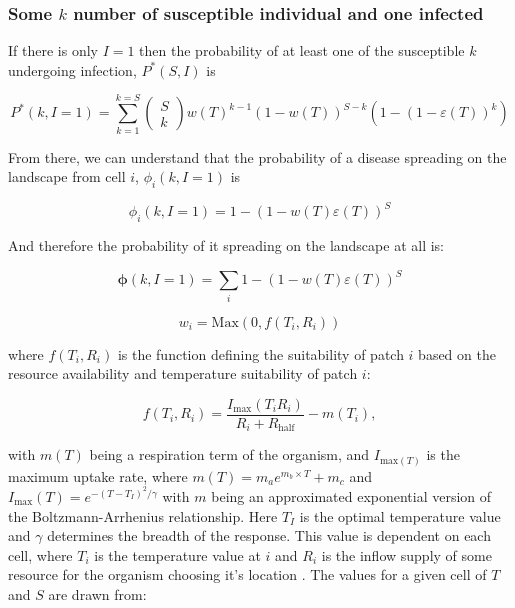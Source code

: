 \subsubsection{Some $k$ number of susceptible individual and one infected}

If there is only $I = 1$ then the probability of at least one of the susceptible $k$ undergoing infection, $P^*(S, I)$ is

\begin{equation}
    P^*(k, I=1) = \sum^{k=S}_{k = 1}\begin{pmatrix} S\\ k \end{pmatrix} w(T)^{k-1}(1-w(T))^{S-k}(1 - (1-\varepsilon(T))^k)
\end{equation}

From there, we can understand that the probability of a disease spreading on the landscape from cell $i$, $\phi_{i}(k, I = 1)$ is 

\begin{equation}
    \phi_{i}(k, I = 1) = 1 - (1 - w(T) \varepsilon(T))^S
\end{equation}

And therefore the probability of it spreading on the landscape at all is:

\begin{equation}
    \boldsymbol{\phi}(k, I = 1) = \sum_i 1 - (1 - w(T) \varepsilon(T))^S
\end{equation}





\begin{equation}
    w_{i} = \text{Max}(0, f(T_{i}, R_{i}))
\end{equation}

where $f(T_{i}, R_{i})$ is the function defining the suitability of patch $i$ based on the resource availability and temperature suitability of patch $i$:

\begin{equation}
    f(T_{i}, R_{i}) = \frac{I_{\text{max}}(T_{i} R_{i})}{R_{i} + R_{\text{half}}} - m(T_{i}),
\end{equation}

with $m(T)$ being a respiration term of the organism, and $I_{\text{max}(T)}$ is the maximum uptake rate, where $m(T) = m_a e^{m_b \times T} + m_c$ and $I_{\text{max}}(T) = e^{-(T - T_I)^2 / \gamma}$ with $m$ being an approximated exponential version of the Boltzmann-Arrhenius relationship. Here $T_I$ is the optimal temperature value and $\gamma$ determines the breadth of the response. This value is dependent on each cell, where $T_{i}$ is the temperature value at $i$ and $R_{i}$ is the inflow supply of some resource for the organism choosing it's location . The values for a given cell of $T$ and $S$ are drawn from:

